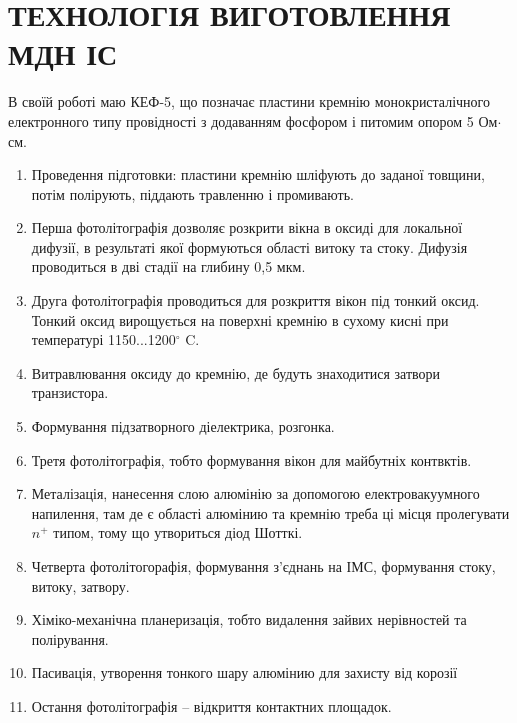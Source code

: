\documentclass[a4paper,14pt]{extreport}
\begin{document}
\newpage
\chapter{ТЕХНОЛОГІЯ ВИГОТОВЛЕННЯ МДН ІС}
	В своїй роботі маю КЕФ-5, що позначає пластини кремнію монокристалічного електронного типу провідності з додаванням фосфором і питомим опором 5 Ом$\cdot$см.\\

	\begin{enumerate}
	\item Проведення підготовки: пластини кремнію шліфують до заданої товщини, потім полірують, піддають травленню і промивають. 



	\item Перша фотолітографія дозволяє розкрити вікна в оксиді для локальної дифузії, в результаті якої формуються області витоку та стоку. Дифузія проводиться в дві
	стадії на глибину 0,5 мкм.\\

	\item Друга фотолітографія проводиться для розкриття вікон під тонкий оксид. Тонкий оксид вирощується на поверхні кремнію в сухому кисні при температурі 1150...1200$^{\circ}$ C.\\

	\item Витравлювання оксиду до кремнію, де будуть знаходитися затвори транзистора.\\

	\item Формування підзатворного діелектрика, розгонка.\\

	\item Третя фотолітографія, тобто формування вікон для майбутніх контвктів.\\

	\item Металізація, нанесення слою алюмінію за допомогою електровакуумного напилення, там де є області алюмінию та кремнію треба ці місця пролегувати $n^+ $ типом, тому що утвориться діод Шотткі.\\

	\item Четверта фотолітогорафія, формування з'єднань на ІМС, формування стоку, витоку, затвору.\\

	\item Хіміко-механічна планеризація, тобто видалення зайвих нерівностей та полірування.\\

	\item Пасивація, утворення тонкого шару алюмінию для захисту від корозії\\

	\item Остання фотолітографія -- відкриття контактних площадок.


\end{enumerate}
\end{document}

